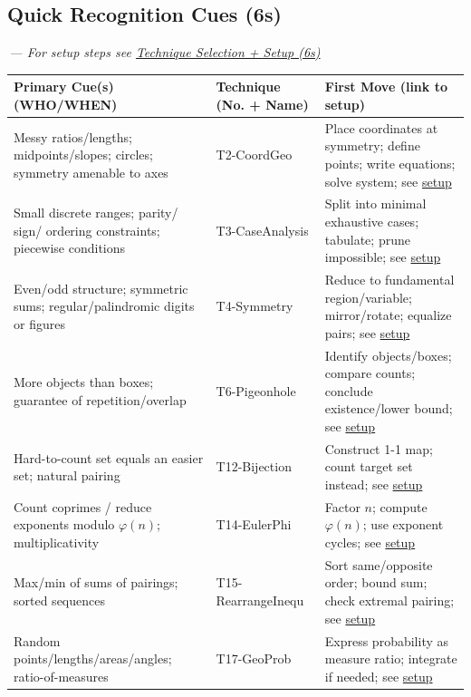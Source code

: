 \documentclass{article}
\begin{document}
\subsection{Quick Recognition Cues (6s)}
{\footnotesize\textcolor{timegreen}{}}\,\textit{— For setup steps see \hyperlink{technique-setup}{Technique Selection + Setup (6s)}}\\
\begin{center}
\begin{longtable}{|>{\raggedright\arraybackslash}m{}|>{\raggedright\arraybackslash}p{}|>{\raggedright\arraybackslash}p{}|}
\hline
\textbf{Primary Cue(s) (WHO/WHEN)} & \textbf{Technique (No. + Name)} & \textbf{First Move (link to setup)} \\
\hline
Messy ratios/lengths; midpoints/slopes; circles; symmetry amenable to axes & T2-CoordGeo & Place coordinates at symmetry; define points; write equations; solve system; see \hyperlink{technique-setup}{setup} \\
\hline
Small discrete ranges; parity/ sign/ ordering constraints; piecewise conditions & T3-CaseAnalysis & Split into minimal exhaustive cases; tabulate; prune impossible; see \hyperlink{technique-setup}{setup} \\
\hline
Even/odd structure; symmetric sums; regular/palindromic digits or figures & T4-Symmetry & Reduce to fundamental region/variable; mirror/rotate; equalize pairs; see \hyperlink{technique-setup}{setup} \\
\hline
More objects than boxes; guarantee of repetition/overlap & T6-Pigeonhole & Identify objects/boxes; compare counts; conclude existence/lower bound; see \hyperlink{technique-setup}{setup} \\
\hline
Hard-to-count set equals an easier set; natural pairing & T12-Bijection & Construct 1-1 map; count target set instead; see \hyperlink{technique-setup}{setup} \\
\hline
Count coprimes / reduce exponents modulo $\varphi(n)$; multiplicativity & T14-EulerPhi & Factor $n$; compute $\varphi(n)$; use exponent cycles; see \hyperlink{technique-setup}{setup} \\
\hline
Max/min of sums of pairings; sorted sequences & T15-RearrangeInequ & Sort same/opposite order; bound sum; check extremal pairing; see \hyperlink{technique-setup}{setup} \\
\hline
Random points/lengths/areas/angles; ratio-of-measures & T17-GeoProb & Express probability as measure ratio; integrate if needed; see \hyperlink{technique-setup}{setup} \\

\end{longtable}
\end{center}
\end{document}
